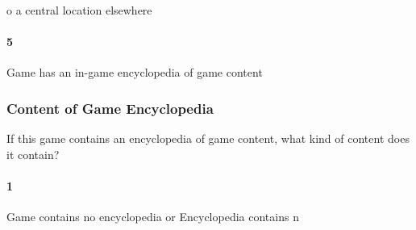 o a central location elsewhere\paragraph{5}Game has an in-game encyclopedia of game content\subsubsection{Content of Game Encyclopedia}If this game contains an encyclopedia of game content, what kind of content does it contain?\paragraph{1}Game contains no encyclopedia or Encyclopedia contains n